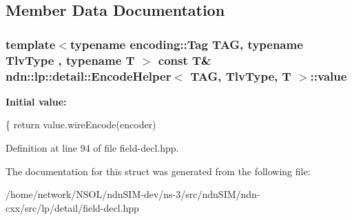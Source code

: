 \subsection{Member Data Documentation}
\subsubsection[{\texorpdfstring{value}{value}}]{\setlength{\rightskip}{0pt plus 5cm}template$<$typename encoding\+::\+Tag T\+AG, typename Tlv\+Type , typename T $>$ const T\& {\bf ndn\+::lp\+::detail\+::\+Encode\+Helper}$<$ T\+AG, Tlv\+Type, T $>$\+::value}\hypertarget{structndn_1_1lp_1_1detail_1_1EncodeHelper_aa364d689aa8e266bc4754bc4e6e735cb}{}\label{structndn_1_1lp_1_1detail_1_1EncodeHelper_aa364d689aa8e266bc4754bc4e6e735cb}
{\bfseries Initial value\+:}
\begin{DoxyCode}
\{
    \textcolor{keywordflow}{return} value.wireEncode(encoder)
\end{DoxyCode}


Definition at line 94 of file field-\/decl.\+hpp.



The documentation for this struct was generated from the following file\+:\begin{DoxyCompactItemize}
\item 
/home/network/\+N\+S\+O\+L/ndn\+S\+I\+M-\/dev/ns-\/3/src/ndn\+S\+I\+M/ndn-\/cxx/src/lp/detail/field-\/decl.\+hpp\end{DoxyCompactItemize}
